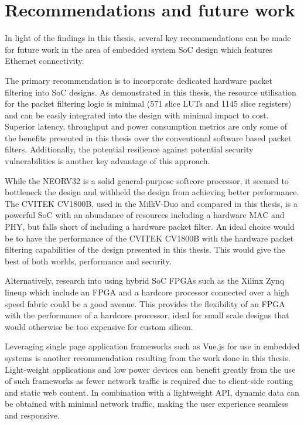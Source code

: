 \section{Recommendations and future work}

In light of the findings in this thesis, several key recommendations can be made for future work in the area of embedded system SoC design which features Ethernet connectivity.

The primary recommendation is to incorporate dedicated hardware packet filtering into SoC designs. As demonstrated in this thesis, the resource utilisation for the packet filtering logic is minimal (571 slice LUTs and 1145 slice registers) and can be easily integrated into the design with minimal impact to cost. Superior latency, throughput and power consumption metrics are only some of the benefits presented in this thesis over the conventional software based packet filters. Additionally, the potential resilience against potential security vulnerabilities is another key advantage of this approach.

While the NEORV32 is a solid general-purpose softcore processor, it seemed to bottleneck the design and withheld the design from achieving better performance. The CVITEK CV1800B, used in the MilkV-Duo and compared in this thesis, is a powerful SoC with an abundance of resources including a hardware MAC and PHY, but falls short of including a hardware packet filter. An ideal choice would be to have the performance of the CVITEK CV1800B with the hardware packet filtering capabilities of the design presented in this thesis. This would give the best of both worlds, performance and security.

Alternatively, research into using hybrid SoC FPGAs such as the Xilinx Zynq lineup which include an FPGA and a hardcore processor connected over a high speed fabric could be a good avenue. This provides the flexibility of an FPGA with the performance of a hardcore processor, ideal for small scale designs that would otherwise be too expensive for custom silicon.

Leveraging single page application frameworks such as Vue.js for use in embedded systems is another recommendation resulting from the work done in this thesis. Light-weight applications and low power devices can benefit greatly from the use of such frameworks as fewer network traffic is required due to client-side routing and static web content. In combination with a lightweight API, dynamic data can be obtained with minimal network traffic, making the user experience seamless and responsive.

